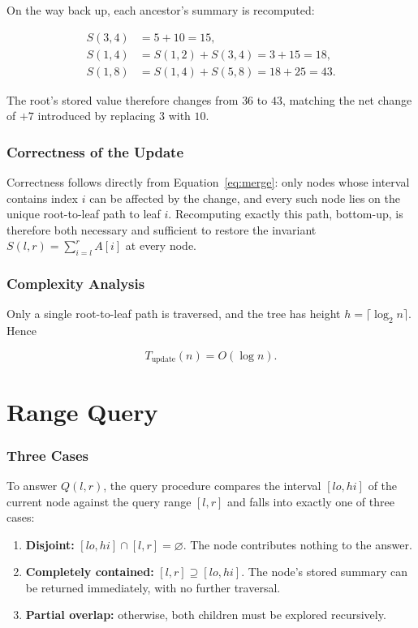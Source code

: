 \documentclass[11pt,open=any]{scrreprt}
\begin{document}
On the way back up, each ancestor's summary is recomputed:

\begin{align}
S(3,4) &= 5 + 10 = 15, \\
S(1,4) &= S(1,2) + S(3,4) = 3 + 15 = 18, \\
S(1,8) &= S(1,4) + S(5,8) = 18 + 25 = 43.
\end{align}

The root's stored value therefore changes from $36$ to $43$, matching the net change of $+7$ introduced by replacing $3$ with $10$.

\subsection{Correctness of the Update}
Correctness follows directly from Equation~\eqref{eq:merge}: only nodes whose interval contains index $i$ can be affected by the change, and every such node lies on the unique root-to-leaf path to leaf $i$. Recomputing exactly this path, bottom-up, is therefore both necessary and sufficient to restore the invariant $S(l,r) = \sum_{i=l}^r A[i]$ at every node.

\subsection{Complexity Analysis}
Only a single root-to-leaf path is traversed, and the tree has height $h = \lceil \log_2 n \rceil$. Hence

\begin{equation}
\boxed{T_{\text{update}}(n) = O(\log n)}.
\end{equation}

\chapter{Range Query}

\subsection{Three Cases}
To answer $Q(l,r)$, the query procedure compares the interval $[lo,hi]$ of the current node against the query range $[l,r]$ and falls into exactly one of three cases:

\begin{enumerate}[nosep]
  \item \textbf{Disjoint:} $[lo,hi] \cap [l,r] = \varnothing$. The node contributes nothing to the answer.
  \item \textbf{Completely contained:} $[l,r] \supseteq [lo,hi]$. The node's stored summary can be returned immediately, with no further traversal.
  \item \textbf{Partial overlap:} otherwise, both children must be explored recursively.
\end{enumerate}
\end{document}

